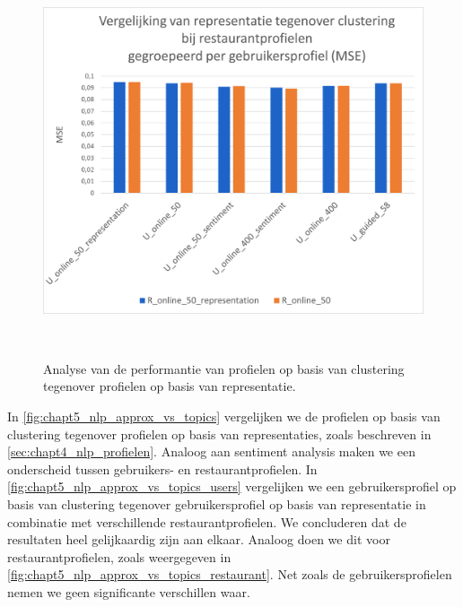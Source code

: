 \begin{figure}[H]
        \centering
        \parbox[b]{0.6\textwidth}{\includegraphics[width=\linewidth]{fig/chapt5/NLP/nlp_comparison_approx_restaurant.png}}\quad
        \parbox[b]{0.37\textwidth}{
        \label{fig:chapt5_nlp_approx_vs_topics_restaurant}}
        \\[.5cm]

        \caption{Analyse van de performantie van profielen op basis van clustering tegenover profielen op basis van representatie.}
        \label{fig:chapt5_nlp_approx_vs_topics}
\end{figure}

In \autoref{fig:chapt5_nlp_approx_vs_topics} vergelijken we de profielen op basis van clustering tegenover profielen op basis van representaties, zoals beschreven in \autoref{sec:chapt4_nlp_profielen}. Analoog aan sentiment analysis maken we een onderscheid tussen gebruikers- en restaurantprofielen. In \autoref{fig:chapt5_nlp_approx_vs_topics_users} vergelijken we een gebruikersprofiel op basis van clustering tegenover gebruikersprofiel op basis van representatie in combinatie met verschillende restaurantprofielen. We concluderen dat de resultaten heel gelijkaardig zijn aan elkaar. Analoog doen we dit voor restaurantprofielen, zoals weergegeven in \autoref{fig:chapt5_nlp_approx_vs_topics_restaurant}. Net zoals de gebruikersprofielen nemen we geen significante verschillen waar. 

